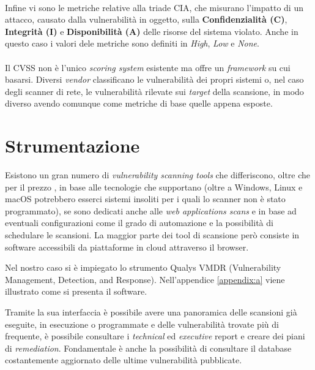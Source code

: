 \documentclass[target=bach,aauheader=]{thud}
\begin{document}
\paragraph{} Infine vi sono le metriche relative alla triade CIA, che misurano l'impatto di un attacco, causato dalla vulnerabilità in oggetto, sulla \textbf{Confidenzialità (C)}, \textbf{Integrità (I)} e \textbf{Disponibilità (A)} delle risorse del sistema violato.
Anche in questo caso i valori dele metriche sono definiti in \textit{High}, \textit{Low} e \textit{None}.

\paragraph{} Il CVSS non è l'unico \textit{scoring system} esistente ma offre un \textit{framework} su cui basarsi. Diversi \textit{vendor} classificano le vulnerabilità dei propri sistemi o, nel caso degli scanner di rete, le vulnerabilità rilevate sui \textit{target} della scansione, in modo diverso avendo comunque come metriche di base quelle appena esposte.

\section{Strumentazione}
Esistono un gran numero di \textit{vulnerability scanning tools} che differiscono, oltre che per il prezzo , in base alle tecnologie che supportano (oltre a Windows, Linux e macOS potrebbero esserci sistemi insoliti per i quali lo scanner non è stato programmato), se sono dedicati anche alle \textit{web applications scans}  e in base ad eventuali configurazioni come il grado di automazione e la possibilità di schedulare le scansioni. La maggior parte dei tool di scansione però consiste in software accessibili da piattaforme in cloud attraverso il browser.

Nel nostro caso si è impiegato lo strumento Qualys VMDR (Vulnerability Management, Detection, and Response). Nell'appendice \ref{appendix:a} viene illustrato come si presenta il software.

Tramite la sua interfaccia è possibile avere una panoramica delle scansioni già eseguite, in esecuzione o programmate e delle vulnerabilità trovate più di frequente, è possibile consultare i \textit{technical} ed \textit{executive} report e creare dei piani di \textit{remediation}. Fondamentale è anche la possibilità di consultare il database costantemente aggiornato delle ultime vulnerabilità pubblicate.
\end{document}
